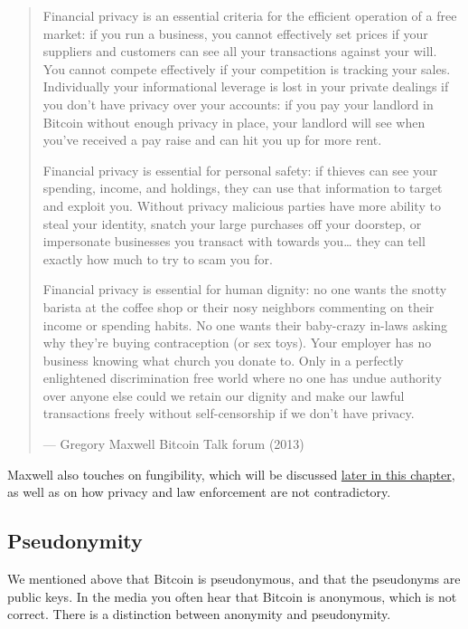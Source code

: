 \begin{quote}
Financial privacy is an essential criteria for the efficient operation
of a free market: if you run a business, you cannot effectively set
prices if your suppliers and customers can see all your transactions
against your will. You cannot compete effectively if your competition is
tracking your sales. Individually your informational leverage is lost in
your private dealings if you don't have privacy over your accounts: if
you pay your landlord in Bitcoin without enough privacy in place, your
landlord will see when you've received a pay raise and can hit you up
for more rent.

Financial privacy is essential for personal safety: if thieves can see
your spending, income, and holdings, they can use that information to
target and exploit you. Without privacy malicious parties have more
ability to steal your identity, snatch your large purchases off your
doorstep, or impersonate businesses you transact with towards
you\ldots\hspace{0pt} they can tell exactly how much to try to scam you
for.

Financial privacy is essential for human dignity: no one wants the
snotty barista at the coffee shop or their nosy neighbors commenting on
their income or spending habits. No one wants their baby-crazy in-laws
asking why they're buying contraception (or sex toys). Your employer has
no business knowing what church you donate to. Only in a perfectly
enlightened discrimination free world where no one has undue authority
over anyone else could we retain our dignity and make our lawful
transactions freely without self-censorship if we don't have privacy.

---  Gregory Maxwell Bitcoin Talk forum (2013)
\end{quote}

Maxwell also touches on fungibility, which will be discussed
\protect\hyperlink{fungibility}{later in this chapter}, as well as on
how privacy and law enforcement are not contradictory.

\hypertarget{pseudonymity}{%
\subsection{Pseudonymity}\label{pseudonymity}}

We mentioned above that Bitcoin is pseudonymous, and that the pseudonyms
are public keys. In the media you often hear that Bitcoin is anonymous,
which is not correct. There is a distinction between anonymity and
pseudonymity.

